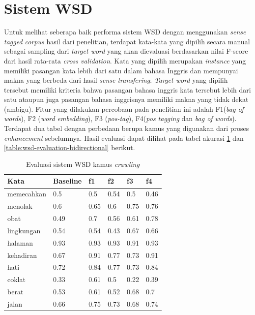 \section{Sistem WSD}

Untuk melihat seberapa baik performa sistem WSD dengan menggunakan \textit{sense tagged corpus} hasil dari penelitian, terdapat kata-kata yang dipilih secara manual sebagai sampling dari \textit{target word} yang akan dievaluasi berdasarkan nilai F-score dari hasil rata-rata \textit{cross validation}. Kata yang dipilih merupakan \textit{instance} yang memiliki pasangan kata lebih dari satu dalam bahasa Inggris dan mempunyai makna yang berbeda dari hasil \textit{sense transfering}. \textit{Target word} yang dipilih tersebut memiliki kriteria bahwa pasangan bahasa inggris kata tersebut lebih dari satu ataupun juga pasangan bahasa inggrisnya memiliki makna yang tidak dekat (ambigu). Fitur yang dilakukan percobaan pada penelitian ini adalah F1(\textit{bag of words}), F2 (\textit{word embedding}), F3 (\textit{pos-tag}), F4(\textit{pos tagging} dan \textit{bag of words}). Terdapat dua tabel dengan perbedaan berupa kamus yang digunakan dari proses \textit{enhancement} sebelumnya. Hasil evaluasi dapat dilihat pada tabel akurasi  \ref{table:wsd-evaluation-crawling} dan \ref{table:wsd-evaluation-bidirectional} berikut.

\begin{table}
	\centering
	\caption{Evaluasi sistem WSD kamus \textit{crawling}}
	\label{table:wsd-evaluation-crawling}
	\begin{tabular}{|p{3cm}|p{1.5cm}|p{1.5cm}|p{1.5cm}|p{1.5cm}|p{1.5cm}|}
		\hline
		Kata & Baseline & f1 & f2 & f3 & f4 \\ \hline
		memecahkan & 0.5 & 0.5 & 0.54 & 0.5 & 0.46 \\ \hline
		menolak & 0.6 & 0.65 & 0.6 & 0.75 & 0.76 \\ \hline
		obat & 0.49 & 0.7 & 0.56 & 0.61 & 0.78 \\ \hline
		lingkungan & 0.54 & 0.54 & 0.43 & 0.67 & 0.66 \\ \hline
		halaman & 0.93 & 0.93 & 0.93 & 0.91 & 0.93 \\ \hline
		kehadiran & 0.67 & 0.91 & 0.77 & 0.73 & 0.91 \\ \hline
		hati & 0.72 & 0.84 & 0.77 & 0.73 & 0.84 \\ \hline
		coklat & 0.33 & 0.61 & 0.5 & 0.22 & 0.39 \\ \hline
		berat & 0.53 & 0.61 & 0.52 & 0.68 & 0.7 \\ \hline
		jalan & 0.66 & 0.75 & 0.73 & 0.68 & 0.74 \\ \hline
	\end{tabular} 
\end{table}


